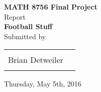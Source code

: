 \begin{titlepage}

\begin{center}

\textup{\small {\bf MATH 8756 Final Project} \\ Report}\\[0.2in]

\Large \textbf {Football Stuff}\\[0.5in]



\normalsize Submitted by \\
\begin{table}[h]
\centering
\begin{tabular}{lr}\hline \\
Brian Detweiler \\
\\ \hline
\end{tabular}
\end{table}

\vspace{.1in}
Thursday, May 5th, 2016

\vfill



\end{center}

\end{titlepage}
